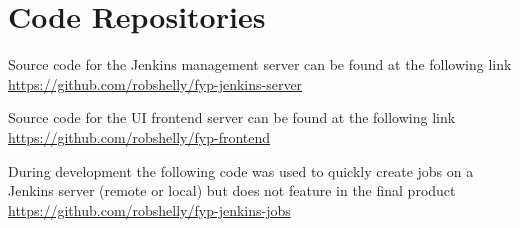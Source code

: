 \section{Code Repositories}

Source code for the Jenkins management server can be found at the following link \\
\href{https://github.com/robshelly/fyp-jenkins-server}{https://github.com/robshelly/fyp-jenkins-server}

Source code for the UI frontend server can be found at the following link \\
\href{https://github.com/robshelly/fyp-frontend}{https://github.com/robshelly/fyp-frontend}

During development the following code was used to quickly create jobs on a Jenkins server (remote or local) but does not feature in the final product \\
\href{https://github.com/robshelly/fyp-jenkins-jobs}{https://github.com/robshelly/fyp-jenkins-jobs}
